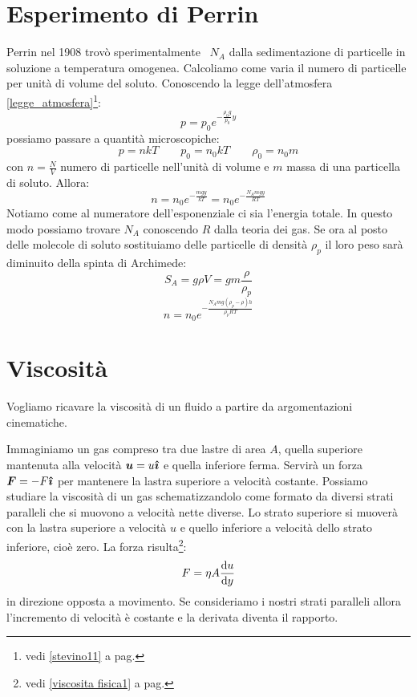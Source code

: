 \section{Esperimento di Perrin}
Perrin nel 1908 trovò sperimentalmente~\cite{perrin1909} $N_A$ dalla sedimentazione di particelle in soluzione a temperatura omogenea. Calcoliamo come varia il numero di particelle per unità di volume del soluto. Conoscendo la legge dell'atmosfera \eqref{legge_atmosfera}\footnote{vedi \ref{stevino11} a pag.\@\pageref{stevino11}}:
\begin{equation}
	p=p_0e^{-\frac{\rho_0 g}{p_0}y}
\end{equation}
possiamo passare a quantità microscopiche:
\[
	p=nkT\qquad p_0=n_0kT\qquad \rho_0=n_0m
\]
con $n=\frac{N}{V}$ numero di particelle nell'unità di volume e $m$ massa di una particella di soluto. Allora:
\begin{equation}
	n=n_0e^{-\frac{mgy}{kT}}=n_0e^{-\frac{N_Amgy}{RT}}
\end{equation}
Notiamo come al numeratore dell'esponenziale ci sia l'energia totale. In questo modo possiamo trovare $N_A$ conoscendo $R$ dalla teoria dei gas. Se ora al posto delle molecole di soluto sostituiamo delle particelle di densità $\rho_p$ il loro peso sarà diminuito della spinta di Archimede:
\[
	S_A=g\rho V=gm\frac{\rho}{\rho_p}
\]
\begin{equation}
	n=n_0 e^{-\frac{N_Amg(\rho_p-\rho)h}{\rho_pRT}}
\end{equation}
\section{Viscosità}
Vogliamo ricavare la viscosità di un fluido a partire da argomentazioni cinematiche.

Immaginiamo un gas compreso tra due lastre di area $A$, quella superiore mantenuta alla velocità $\boldsymbol{u}=u\boldsymbol{\hat {\imath}}$ e quella inferiore ferma. Servirà un forza $\boldsymbol{F}=-F\boldsymbol{\hat {\imath}}$ per mantenere la lastra superiore a velocità costante. Possiamo studiare la viscosità di un gas schematizzandolo come formato da diversi strati paralleli che si muovono a velocità nette diverse. Lo strato superiore si muoverà con la lastra superiore a velocità $u$ e quello inferiore a velocità dello strato inferiore, cioè zero. La forza risulta\footnote{vedi \ref{viscosita fisica1} a pag.\@\pageref{viscosita fisica1}}:
\begin{equation}
	\label{eq:viscosita_cinetica}
	F=\eta A \frac{\mathrm{d} u}{\mathrm{d} y}
\end{equation}
in direzione opposta a movimento. Se consideriamo i nostri strati paralleli allora l'incremento di velocità è costante e la derivata diventa il rapporto.

